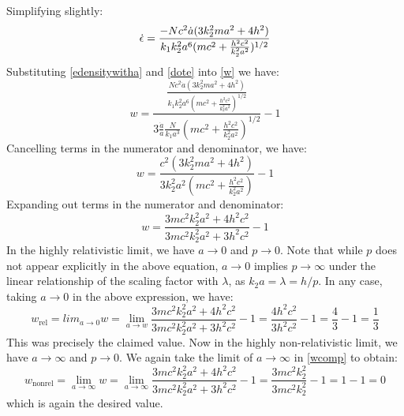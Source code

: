 Simplifying slightly:
\begin{equation}\label{dote}
    \dot{\epsilon} = \frac{-Nc^2\dot{a}(3k_2^2 m a^2 + 4h^2)}{k_1k_2^2a^6(mc^2 + \frac{h^2c^2}{k_2^2 a^2})^{1/2}}
\end{equation}
Substituting \eqref{edensitywitha} and \eqref{dote} into \eqref{w} we have:
\begin{equation}
    w = \frac{\frac{Nc^2\dot{a}(3k_2^2 m a^2 + 4h^2)}{k_1k_2^2a^6(mc^2 + \frac{h^2c^2}{k_2^2 a^2})^{1/2}}}{3\frac{\dot{a}}{a}\frac{N}{k_1 a^3}(mc^2 + \frac{h^2c^2}{k_2^2 a^2})^{1/2}} - 1
\end{equation}
Cancelling terms in the numerator and denominator, we have:
\begin{equation}
    w = \frac{c^2(3k_2^2 m a^2 + 4h^2)}{3k_2^2a^2(mc^2 + \frac{h^2c^2}{k_2^2 a^2})} - 1
\end{equation}
Expanding out terms in the numerator and denominator:
\begin{equation}\label{wcomp}
    w = \frac{3m c^2k_2^2a^2 + 4h^2c^2}{3mc^2k_2^2a^2 + 3h^2c^2} - 1
\end{equation}
In the highly relativistic limit, we have $a \to 0$ and $p \to 0$. Note that while $p$ does not appear explicitly in the above equation, $a\to 0$ implies $p \to \infty$ under the linear relationship of the scaling factor with $\lambda$, as $k_2 a = \lambda = h/p$. In any case, taking $a \to 0$ in the above expression, we have:
\begin{equation}
    \boxed{w_{\text{rel}} = lim_{a \to 0} w = \lim_{a \to w}\frac{3m c^2k_2^2a^2 + 4h^2c^2}{3mc^2k_2^2a^2 + 3h^2c^2} - 1 = \frac{4h^2c^2}{3h^2c^2} - 1 = \frac{4}{3} - 1 = \frac{1}{3}}
\end{equation}
This was precisely the claimed value. Now in the highly non-relativistic limit, we have $a \to \infty$ and $p \to 0$. We again take the limit of $a \to \infty$ in \eqref{wcomp} to obtain:
\begin{equation}
    \boxed{w_{\text{nonrel}} = \lim_{a \to \infty} w = \lim_{a \to \infty}\frac{3m c^2k_2^2a^2 + 4h^2c^2}{3mc^2k_2^2a^2 + 3h^2c^2} - 1 = \frac{3m c^2k_2^2}{3mc^2k_2^2} - 1 = 1 - 1 = 0}
\end{equation}
which is again the desired value.

